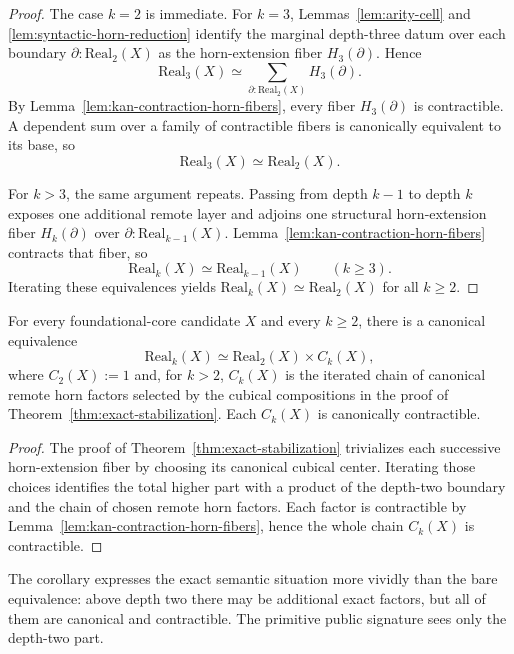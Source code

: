 \begin{proof}
The case \(k=2\) is immediate.  For \(k=3\), Lemmas~\ref{lem:arity-cell} and
\ref{lem:syntactic-horn-reduction} identify the marginal depth-three datum over each
boundary \(\partial:\mathrm{Real}_2(X)\) as the horn-extension fiber \(H_3(\partial)\).  Hence
\[
  \mathrm{Real}_3(X)
  \simeq
  \sum_{\partial:\mathrm{Real}_2(X)} H_3(\partial).
\]
By Lemma~\ref{lem:kan-contraction-horn-fibers}, every fiber \(H_3(\partial)\) is
contractible.  A dependent sum over a family of contractible fibers is canonically equivalent
to its base, so
\[
  \mathrm{Real}_3(X) \simeq \mathrm{Real}_2(X).
\]

For \(k>3\), the same argument repeats.  Passing from depth \(k-1\) to depth \(k\) exposes
one additional remote layer and adjoins one structural horn-extension fiber \(H_k(\partial)\)
over \(\partial:\mathrm{Real}_{k-1}(X)\).  Lemma~\ref{lem:kan-contraction-horn-fibers}
contracts that fiber, so
\[
  \mathrm{Real}_k(X) \simeq \mathrm{Real}_{k-1}(X)
  \qquad (k\geq 3).
\]
Iterating these equivalences yields \(\mathrm{Real}_k(X)\simeq\mathrm{Real}_2(X)\) for all
\(k\geq 2\).
\end{proof}

\begin{corollary}
\label{cor:contractible-factor-decomposition}
For every foundational-core candidate \(X\) and every \(k\geq 2\), there is a canonical
equivalence
\[
  \mathrm{Real}_k(X)
  \simeq
  \mathrm{Real}_2(X) \times C_k(X),
\]
where \(C_2(X):=1\) and, for \(k>2\), \(C_k(X)\) is the iterated chain of canonical remote
horn factors selected by the cubical compositions in the proof of
Theorem~\ref{thm:exact-stabilization}.  Each \(C_k(X)\) is canonically contractible.
\end{corollary}

\begin{proof}
The proof of Theorem~\ref{thm:exact-stabilization} trivializes each successive horn-extension
fiber by choosing its canonical cubical center.  Iterating those choices identifies the total
higher part with a product of the depth-two boundary and the chain of chosen remote horn
factors.  Each factor is contractible by Lemma~\ref{lem:kan-contraction-horn-fibers}, hence
the whole chain \(C_k(X)\) is contractible.
\end{proof}

The corollary expresses the exact semantic situation more vividly than the bare equivalence:
above depth two there may be additional exact factors, but all of them are canonical and
contractible.  The primitive public signature sees only the depth-two part.

